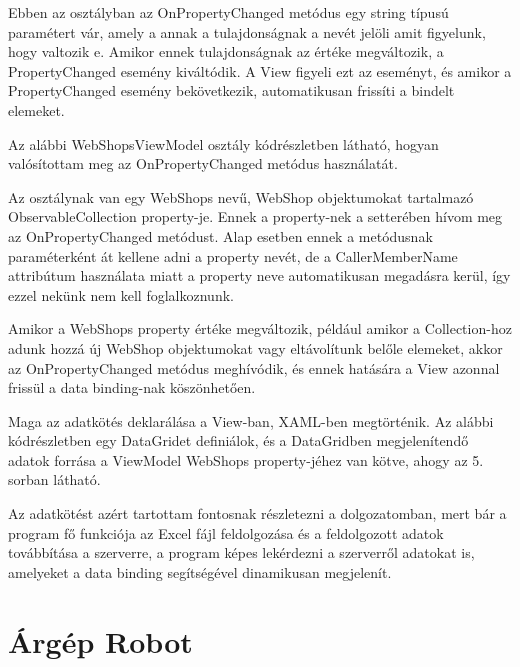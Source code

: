 \documentclass[
]{thesis-ekf}
\theoremstyle{definition}
\theoremstyle{remark}
\begin{document}


Ebben az osztályban az OnPropertyChanged metódus egy string típusú paramétert vár, amely a annak a tulajdonságnak a  nevét jelöli amit figyelunk, hogy valtozik e. Amikor ennek tulajdonságnak az értéke megváltozik, a PropertyChanged esemény kiváltódik. A View figyeli ezt az eseményt, és amikor a PropertyChanged esemény bekövetkezik, automatikusan frissíti a bindelt elemeket.

Az alábbi WebShopsViewModel osztály kódrészletben látható, hogyan valósítottam meg az OnPropertyChanged metódus használatát. 

Az osztálynak van egy WebShops nevű, WebShop objektumokat tartalmazó ObservableCollection property-je. Ennek a property-nek a setterében hívom meg az OnPropertyChanged metódust. Alap esetben ennek a metódusnak paraméterként át kellene adni a property nevét, de a CallerMemberName attribútum használata miatt a property neve automatikusan megadásra kerül, így ezzel nekünk nem kell foglalkoznunk.
\newpage


Amikor a WebShops property értéke megváltozik, például amikor a Collection-hoz adunk hozzá új WebShop objektumokat vagy eltávolítunk belőle elemeket, akkor az OnPropertyChanged metódus meghívódik, és ennek hatására a View azonnal frissül a data binding-nak köszönhetően. 

Maga az adatkötés deklarálása a View-ban, XAML-ben megtörténik. Az alábbi kódrészletben egy DataGridet definiálok, és a DataGridben megjelenítendő adatok forrása a ViewModel WebShops property-jéhez van kötve, ahogy az 5. sorban látható.


Az adatkötést azért tartottam fontosnak részletezni a dolgozatomban, mert bár a program fő funkciója az Excel fájl feldolgozása és a feldolgozott adatok továbbítása a szerverre, a program képes lekérdezni a szerverről adatokat is, amelyeket a data binding segítségével dinamikusan megjelenít.

\section{Árgép Robot}
\end{document}
